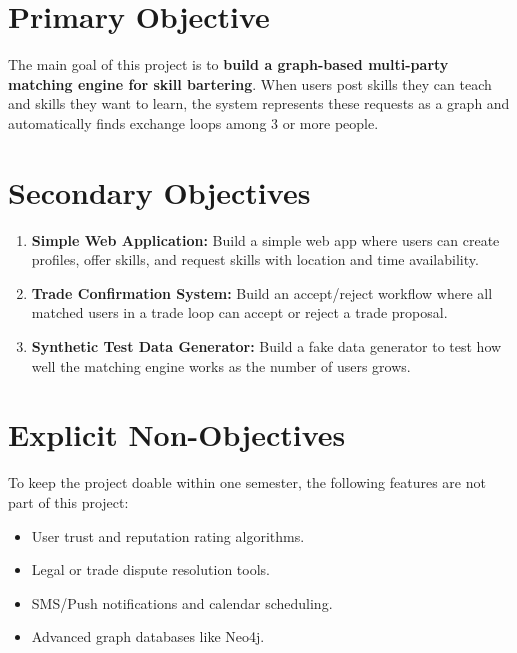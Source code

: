 \section{Primary Objective}

The main goal of this project is to \textbf{build a graph-based multi-party matching engine for skill bartering}. When users post skills they can teach and skills they want to learn, the system represents these requests as a graph and automatically finds exchange loops among 3 or more people.

\section{Secondary Objectives}

\begin{enumerate}
    \item \textbf{Simple Web Application:} Build a simple web app where users can create profiles, offer skills, and request skills with location and time availability.
    \item \textbf{Trade Confirmation System:} Build an accept/reject workflow where all matched users in a trade loop can accept or reject a trade proposal.
    \item \textbf{Synthetic Test Data Generator:} Build a fake data generator to test how well the matching engine works as the number of users grows.
\end{enumerate}

\section{Explicit Non-Objectives}

To keep the project doable within one semester, the following features are not part of this project:
\begin{itemize}
    \item User trust and reputation rating algorithms.
    \item Legal or trade dispute resolution tools.
    \item SMS/Push notifications and calendar scheduling.
    \item Advanced graph databases like Neo4j.
\end{itemize}